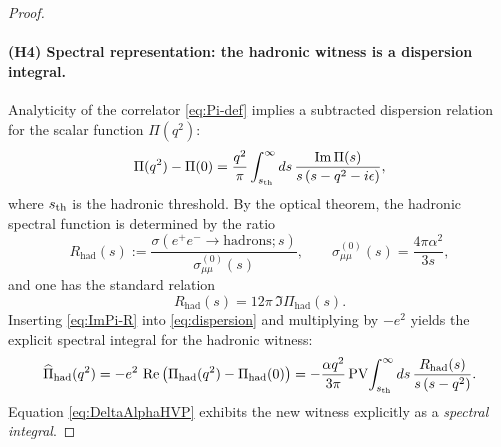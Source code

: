\documentclass[11pt]{article}
\theoremstyle{remark}
\begin{document}
\begin{proof}
\paragraph{(H4) Spectral representation: the hadronic witness is a dispersion integral.}
Analyticity of the correlator \eqref{eq:Pi-def} implies a subtracted dispersion relation for the scalar function $\Pi(q^2)$:
\begin{equation}\label{eq:dispersion}
\Pi(q^2)-\Pi(0)=\frac{q^2}{\pi}\int_{s_{\rm th}}^{\infty}ds\,\frac{\Im\Pi(s)}{s\,(s-q^2-i\epsilon)},
\end{equation}
where $s_{\rm th}$ is the hadronic threshold.
By the optical theorem, the hadronic spectral function is determined by the ratio
\begin{equation}\label{eq:Rdef}
R_{\mathrm{had}}(s):=\frac{\sigma(e^+e^-\to\mathrm{hadrons};s)}{\sigma^{(0)}_{\mu\mu}(s)},\qquad \sigma^{(0)}_{\mu\mu}(s)=\frac{4\pi\alpha^2}{3s},
\end{equation}
and one has the standard relation
\begin{equation}\label{eq:ImPi-R}
R_{\mathrm{had}}(s)=12\pi\,\Im\Pi_{\mathrm{had}}(s).
\end{equation}
Inserting \eqref{eq:ImPi-R} into \eqref{eq:dispersion} and multiplying by $-e^2$ yields the explicit spectral integral for the hadronic witness:
\begin{equation}\label{eq:DeltaAlphaHVP}
\widehat\Pi_{\mathrm{had}}(q^2)
=-e^2\,\Re\big(\Pi_{\mathrm{had}}(q^2)-\Pi_{\mathrm{had}}(0)\big)
=-\frac{\alpha q^2}{3\pi}\,\mathrm{PV}\!\int_{s_{\rm th}}^{\infty}ds\,\frac{R_{\mathrm{had}}(s)}{s\,(s-q^2)}.
\end{equation}
Equation \eqref{eq:DeltaAlphaHVP} exhibits the new witness explicitly as a \emph{spectral integral}.


\end{proof}
\end{document}
